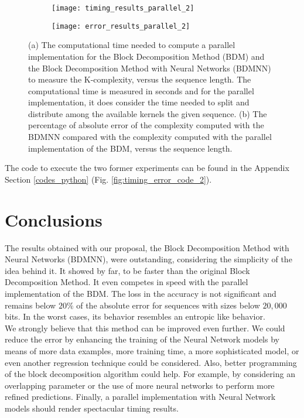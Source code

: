\begin{figure}
	\centering
	\begin{subfigure}[b]{0.8\textwidth}
		\centering
		\texttt{[image: timing\_results\_parallel\_2]}
		\caption{}
		\label{fig:timing_results_parallel_2}
	\end{subfigure}
	\hspace{0.001mm}
	\begin{subfigure}[b]{0.8\textwidth}
		\centering
		\texttt{[image: error\_results\_parallel\_2]}
		\caption{}
		\label{fig:error_results_parallel_2}
	\end{subfigure}
	\caption[Computational time and absolute error obtained with the BDMNN versus a parallel implementation of the BDM.]{(a) The computational time needed to compute a parallel implementation for the Block Decomposition Method (BDM) and the Block Decomposition Method with Neural Networks (BDMNN) to measure the K-complexity, versus the sequence length. The computational time is measured in seconds and for the parallel implementation, it does consider the time needed to split and distribute among the available kernels the given sequence. (b) The percentage of absolute error of the complexity computed with the BDMNN compared with the complexity computed with the parallel implementation of the BDM, versus the sequence length.}
	\label{fig:tim_error_results_parallel_2}
\end{figure}

The code to execute the two former experiments can be found in the Appendix Section \ref{codes_python} (Fig. \ref{fig:timing_error_code_2}).

\section{Conclusions}
The results obtained with our proposal, the Block Decomposition Method with Neural Networks (BDMNN), were outstanding, considering the simplicity of the idea behind it. It showed by far, to be faster than the original Block Decomposition Method. It even competes in speed with the parallel implementation of the BDM. The loss in the accuracy is not significant and remains below $20 \%$ of the absolute error for sequences with sizes below $20,000$ bits. In the worst cases, its behavior resembles an entropic like behavior.\\

We strongly believe that this method can be improved even further. We could reduce the error by enhancing the training of the Neural Network models by means of more data examples, more training time, a more sophisticated model, or even another regression technique could be considered. Also, better programming of the block decomposition algorithm could help. For example, by considering an overlapping parameter or the use of more neural networks to perform more refined predictions. Finally, a parallel implementation with Neural Network models should render spectacular timing results.\\

